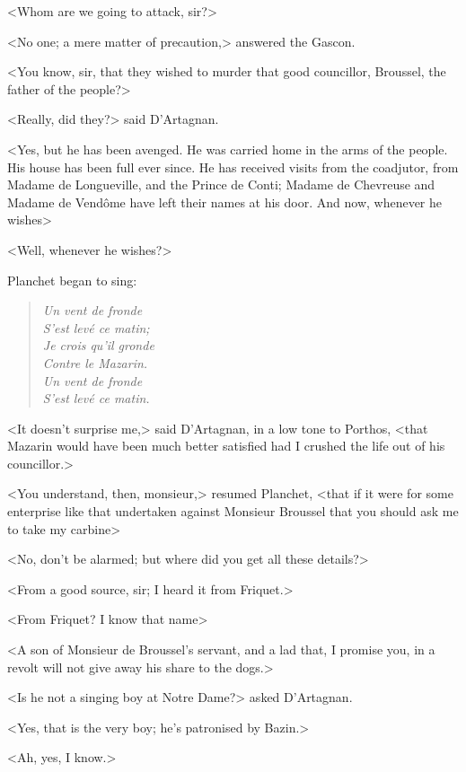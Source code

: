 <Whom are we going to attack, sir?>

<No one; a mere matter of precaution,> answered the Gascon.

<You know, sir, that they wished to murder that good councillor, Broussel, the father of the people?>

<Really, did they?> said D'Artagnan.

<Yes, but he has been avenged. He was carried home in the arms of the people. His house has been full ever since. He has received visits from the coadjutor, from Madame de Longueville, and the Prince de Conti; Madame de Chevreuse and Madame de Vendôme have left their names at his door. And now, whenever he wishes\longdash>

<Well, whenever he wishes?>

Planchet began to sing:  
\begin{verse}
	\begin{altverse}\itshape
	Un vent de fronde\\
	S'est levé ce matin;\\
	Je crois qu'il gronde\\
	Contre le Mazarin.\\
	Un vent de fronde\\
	S'est levé ce matin.
	\end{altverse}
\end{verse}

<It doesn't surprise me,> said D'Artagnan, in a low tone to Porthos, <that Mazarin would have been much better satisfied had I crushed the life out of his councillor.>

<You understand, then, monsieur,> resumed Planchet, <that if it were for some enterprise like that undertaken against Monsieur Broussel that you should ask me to take my carbine\longdash>

<No, don't be alarmed; but where did you get all these details?>

<From a good source, sir; I heard it from Friquet.>

<From Friquet? I know that name\longdash>

<A son of Monsieur de Broussel's servant, and a lad that, I promise you, in a revolt will not give away his share to the dogs.>

<Is he not a singing boy at Notre Dame?> asked D'Artagnan.

<Yes, that is the very boy; he's patronised by Bazin.>

<Ah, yes, I know.>

